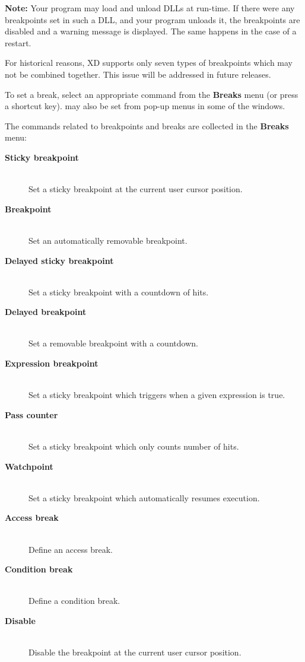 {\bf Note:} Your program may load and unload DLLs at run-time.
If there were any breakpoints set in such a DLL, and your program unloads
it, the breakpoints are disabled and a warning message is displayed.
The same happens in the case of a restart.

For historical reasons, XD supports only seven types of breakpoints
which may not be combined together. This issue will be addressed
in future releases.

To set a break, select an appropriate command from the {\bf Breaks} menu
(or press a shortcut key). 
may also be set from pop-up menus in some of the windows.

The commands related to breakpoints and breaks are collected in the {\bf Breaks}
menu:
\begin{description}
\item[{\bf Sticky breakpoint}] \mbox{} \\
    Set a sticky breakpoint at the current user cursor position.
\item[{\bf Breakpoint}] \mbox{} \\
    Set an automatically removable breakpoint.
\item[{\bf Delayed sticky breakpoint}] \mbox{} \\
    Set a sticky breakpoint with a countdown of hits.
\item[{\bf Delayed breakpoint}] \mbox{} \\
    Set a removable breakpoint with a countdown.
\item[{\bf Expression breakpoint}] \mbox{} \\
    Set a sticky breakpoint which triggers when a given expression is true.
\item[{\bf Pass counter}] \mbox{} \\
    Set a sticky breakpoint which only counts number of hits.
\item[{\bf Watchpoint}] \mbox{} \\
    Set a sticky breakpoint which automatically resumes execution.
\item[{\bf Access break}] \mbox{} \\
    Define an access break.
\item[{\bf Condition break}] \mbox{} \\
    Define a condition break.
\item[{\bf Disable}] \mbox{} \\
    Disable the breakpoint at the current user cursor position.

\end{description}
